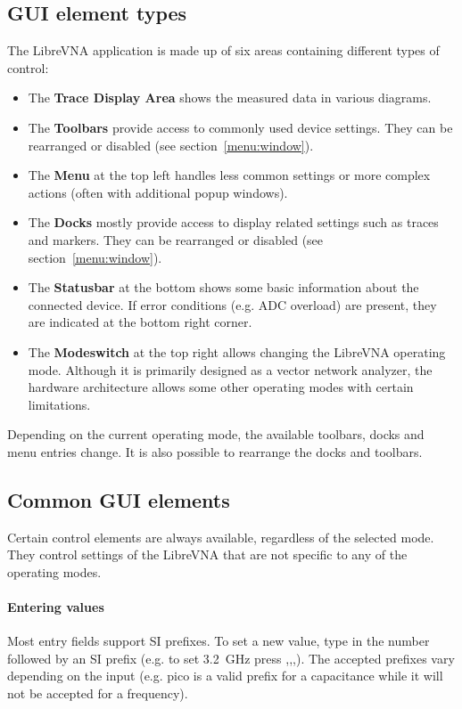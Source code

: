 \documentclass[a4paper,11pt]{article}
\newcommand{\vna}{LibreVNA}
\begin{document}
\subsection{GUI element types}
The \vna{} application is made up of six areas containing different types of control:
\begin{itemize}
\item The \textbf{Trace Display Area} shows the measured data in various diagrams.
\item The \textbf{Toolbars} provide access to commonly used device settings. They can be rearranged or disabled (see section~\ref{menu:window}).
\item The \textbf{Menu} at the top left handles less common settings or more complex actions (often with additional popup windows).
\item The \textbf{Docks} mostly provide access to display related settings such as traces and markers. They can be rearranged or disabled (see section~\ref{menu:window}).
\item The \textbf{Statusbar} at the bottom shows some basic information about the connected device. If error conditions (e.g. ADC overload) are present, they are indicated at the bottom right corner.
\item The \textbf{Modeswitch} at the top right allows changing the \vna{} operating mode. Although it is primarily designed as a vector network analyzer, the hardware architecture allows some other operating modes with certain limitations.
\end{itemize}
Depending on the current operating mode, the available toolbars, docks and menu entries change. It is also possible to rearrange the docks and toolbars.

\subsection{Common GUI elements}
Certain control elements are always available, regardless of the selected mode. They control settings of the \vna{} that are not specific to any of the operating modes.

\paragraph{Entering values}\hfill\newline
Most entry fields support SI prefixes. To set a new value, type in the number followed by an SI prefix (e.g. to set \SI{3.2}{\giga\hertz} press ,,,). The accepted prefixes vary depending on the input (e.g. pico is a valid prefix for a capacitance while it will not be accepted for a frequency). 
\end{document}
